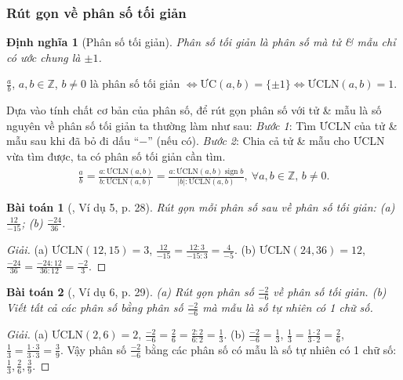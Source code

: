 \documentclass{article}
\newtheorem{baitoan}{Bài toán}
\newtheorem{dinhnghia}{Định nghĩa}
\begin{document}
\subsubsection{Rút gọn về phân số tối giản}

\begin{dinhnghia}[Phân số tối giản]
	\emph{Phân số tối giản} là phân số mà tử \& mẫu chỉ có ước chung là $\pm1$.
\end{dinhnghia}
$\frac{a}{b}$, $a,b\in\mathbb{Z}$, $b\ne0$ là phân số tối giản $\Leftrightarrow\mbox{ƯC}(a,b) = \{\pm1\}\Leftrightarrow\mbox{ƯCLN}(a,b) = 1$.

Dựa vào tính chất cơ bản của phân số, để rút gọn phân số với tử \& mẫu là số nguyên về phân số tối giản ta thường làm như sau: \textit{Bước 1}: Tìm ƯCLN của tử \& mẫu sau khi đã bỏ đi dấu ``$-$'' (nếu có). \textit{Bước 2}: Chia cả tử \& mẫu cho ƯCLN vừa tìm được, ta có phân số tối giản cần tìm.
\begin{align*}
	\frac{a}{b} = \frac{a:\mbox{ƯCLN}(a,b)}{b:\mbox{ƯCLN}(a,b)} = \frac{a:\mbox{ƯCLN}(a,b)\operatorname{sign}b}{|b|:\mbox{ƯCLN}(a,b)},\ \forall a,b\in\mathbb{Z},\,b\ne0.
\end{align*}

\begin{baitoan}[\cite{SGK_Toan_6_Canh_Dieu_tap_2}, Ví dụ 5, p. 28]
	Rút gọn mỗi phân số sau về phân số tối giản: (a) $\frac{12}{-15}$; (b) $\frac{-24}{36}$.
\end{baitoan}

\begin{proof}[Giải]
	(a) $\mbox{ƯCLN}(12,15) = 3$, $\frac{12}{-15} = \frac{12:3}{-15:3} = \frac{4}{-5}$. (b) $\mbox{ƯCLN}(24,36) = 12$, $\frac{-24}{36} = \frac{-24:12}{36:12} = \frac{-2}{3}$.
\end{proof}

\begin{baitoan}[\cite{SGK_Toan_6_Canh_Dieu_tap_2}, Ví dụ 6, p. 29]
	(a) Rút gọn phân số $\frac{-2}{-6}$ về phân số tối giản. (b) Viết tất cả các phân số bằng phân số $\frac{-2}{-6}$ mà mẫu là số  tự nhiên có 1 chữ số.
\end{baitoan}

\begin{proof}[Giải]
	(a) $\mbox{ƯCLN}(2,6) = 2$, $\frac{-2}{-6} = \frac{2}{6} = \frac{2:2}{6:2} = \frac{1}{3}$. (b) $\frac{-2}{-6} = \frac{1}{3}$, $\frac{1}{3} = \frac{1\cdot2}{3\cdot2} = \frac{2}{6}$, $\frac{1}{3} = \frac{1\cdot3}{3\cdot3} = \frac{3}{9}$. Vậy phân số $\frac{-2}{-6}$ bằng các phân số có mẫu là số tự nhiên có 1 chữ số: $\frac{1}{3},\frac{2}{6},\frac{3}{9}$.
\end{proof}
\end{document}
